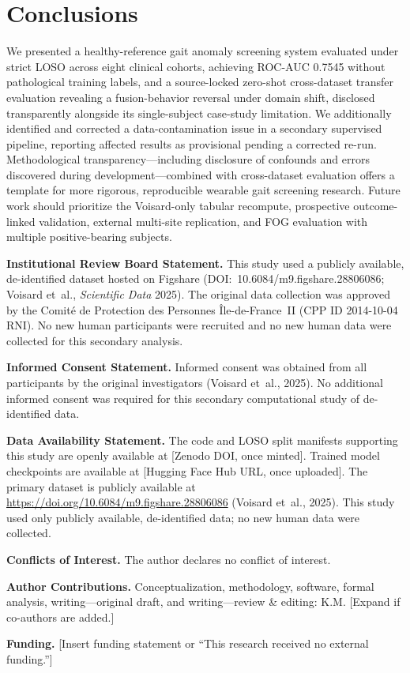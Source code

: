 \documentclass[11pt,a4paper]{article}
\begin{document}
\section{Conclusions}

We presented a healthy-reference gait anomaly screening system evaluated under strict LOSO across eight clinical cohorts, achieving ROC-AUC 0.7545 without pathological training labels, and a source-locked zero-shot cross-dataset transfer evaluation revealing a fusion-behavior reversal under domain shift, disclosed transparently alongside its single-subject case-study limitation. We additionally identified and corrected a data-contamination issue in a secondary supervised pipeline, reporting affected results as provisional pending a corrected re-run. Methodological transparency---including disclosure of confounds and errors discovered during development---combined with cross-dataset evaluation offers a template for more rigorous, reproducible wearable gait screening research. Future work should prioritize the Voisard-only tabular recompute, prospective outcome-linked validation, external multi-site replication, and FOG evaluation with multiple positive-bearing subjects.

\vspace{1em}
\noindent\textbf{Institutional Review Board Statement.} This study used a publicly available, de-identified dataset hosted on Figshare (DOI:~10.6084/m9.figshare.28806086; Voisard et~al., \textit{Scientific Data} 2025). The original data collection was approved by the Comit\'e de Protection des Personnes \^Ile-de-France~II (CPP ID 2014-10-04 RNI). No new human participants were recruited and no new human data were collected for this secondary analysis.

\noindent\textbf{Informed Consent Statement.} Informed consent was obtained from all participants by the original investigators (Voisard et~al., 2025). No additional informed consent was required for this secondary computational study of de-identified data.

\noindent\textbf{Data Availability Statement.} The code and LOSO split manifests supporting this study are openly available at [Zenodo DOI, once minted]. Trained model checkpoints are available at [Hugging Face Hub URL, once uploaded]. The primary dataset is publicly available at \url{https://doi.org/10.6084/m9.figshare.28806086} (Voisard et~al., 2025). This study used only publicly available, de-identified data; no new human data were collected.

\noindent\textbf{Conflicts of Interest.} The author declares no conflict of interest.

\noindent\textbf{Author Contributions.} Conceptualization, methodology, software, formal analysis, writing---original draft, and writing---review \& editing: K.M. [Expand if co-authors are added.]

\noindent\textbf{Funding.} [Insert funding statement or ``This research received no external funding.'']



\end{document}
